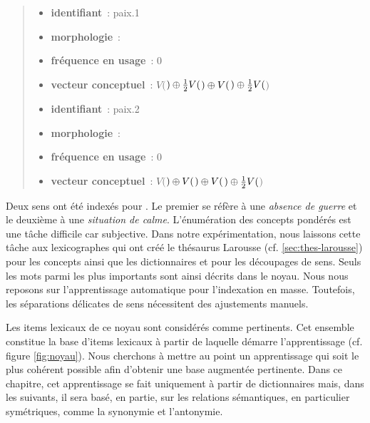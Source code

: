 \begin{quotation}\noindent
  \begin{itemize}
  \item \textbf{identifiant}~: paix.1
  \item \textbf{morphologie}~: \morpho{[nom]}
  \item \textbf{fréquence en usage}~: 0
  \item \textbf{vecteur conceptuel}~: $V($$) \oplus
    \frac{1}{2} V($$) \oplus V($$)
    \oplus \frac{1}{2} V($$)$
  \end{itemize}
  
  \vspace{0.5cm}
  
  \begin{itemize}
  \item \textbf{identifiant}~: paix.2
  \item \textbf{morphologie}~: \morpho{[nom]}
  \item \textbf{fréquence en usage}~: 0
  \item \textbf{vecteur conceptuel}~: $V($$) \oplus
    V($$) \oplus V($$) \oplus
    \frac{1}{2} V($$)$
  \end{itemize}
\end{quotation}

Deux sens ont été indexés pour .  Le premier se réfère à
une \textit{absence de guerre} et le deuxième à une \textit{situation
  de calme}. L'énumération des concepts pondérés est une tâche
difficile car subjective. Dans notre expérimentation, nous laissons
cette tâche aux lexicographes qui ont créé le thésaurus Larousse
\cite{Thesaurus1992} (cf. \ref{sec:thes-larousse}) pour les concepts
ainsi que les dictionnaires \cite{Larousse2001} et \cite{Robert2000}
pour les découpages de sens. Seuls les mots parmi les plus importants
sont ainsi décrits dans le noyau. Nous nous reposons sur
l'apprentissage automatique pour l'indexation en masse. Toutefois, les
séparations délicates de sens nécessitent des ajustements manuels.

Les items lexicaux de ce noyau sont considérés comme pertinents.  Cet
ensemble constitue la base d'items lexicaux à partir de laquelle
démarre l'apprentissage (cf. figure \ref{fig:noyau}).  Nous cherchons
à mettre au point un apprentissage qui soit le plus cohérent possible
afin d'obtenir une base augmentée pertinente. Dans ce chapitre, cet
apprentissage se fait uniquement à partir de dictionnaires mais, dans
les suivants, il sera basé, en partie, sur les relations sémantiques,
en particulier symétriques, comme la synonymie et l'antonymie.

